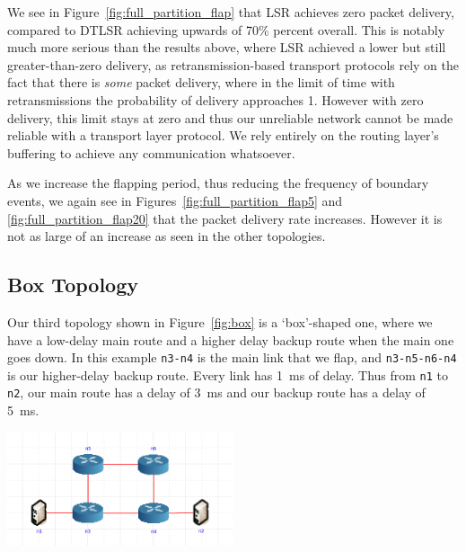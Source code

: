 \documentclass[withindex,glossary,openany]{cam-thesis}
\begin{document}
We see in Figure~\ref{fig:full_partition_flap} that LSR achieves zero packet delivery, compared to DTLSR achieving upwards of 70\% percent overall. This is notably much more serious than the results above, where LSR achieved a lower but still greater-than-zero delivery, as retransmission-based transport protocols rely on the fact that there is \textit{some} packet delivery, where in the limit of time with retransmissions the probability of delivery approaches 1. However with zero delivery, this limit stays at zero and thus our unreliable network cannot be made reliable with a transport layer protocol. We rely entirely on the routing layer's buffering to achieve any communication whatsoever.

As we increase the flapping period, thus reducing the frequency of boundary events, we again see in Figures~\ref{fig:full_partition_flap5} and \ref{fig:full_partition_flap20} that the packet delivery rate increases. However it is not as large of an increase as seen in the other topologies.


\subsection{Box Topology}

Our third topology shown in Figure~\ref{fig:box} is a `box'-shaped one, where we have a low-delay main route and a higher delay backup route when the main one goes down. In this example \texttt{n3-n4} is the main link that we flap, and \texttt{n3-n5-n6-n4} is our higher-delay backup route. Every link has \SI{1}{\ms} of delay. Thus from \texttt{n1} to \texttt{n2}, our main route has a delay of \SI{3}{\ms} and our backup route has a delay of \SI{5}{\ms}.

\begin{minipage}{1\textwidth} \centering
	\includegraphics[width=0.5\textwidth]{delay_box_topology}
\end{minipage}
\end{document}
